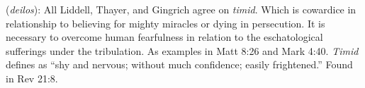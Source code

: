 \item[Timid,]

(\textit{deilos}):
All Liddell, Thayer, and Gingrich agree on \emph{timid}. Which is cowardice in relationship to believing for mighty miracles or dying in persecution. It is necessary to overcome human fearfulness in relation to the eschatological sufferings under the tribulation. As examples in Matt 8:26 and Mark 4:40. \emph{Timid} defines as ``shy and nervous; without much confidence; easily frightened.''
Found in Rev 21:8.
